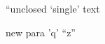 \documentclass[11pt]{article}
\author{Au}
\date{2026-01-01}
\title{}
\begin{document}
\tableofcontents

``unclosed `single' text

new para 'q' ``z''
\end{document}
